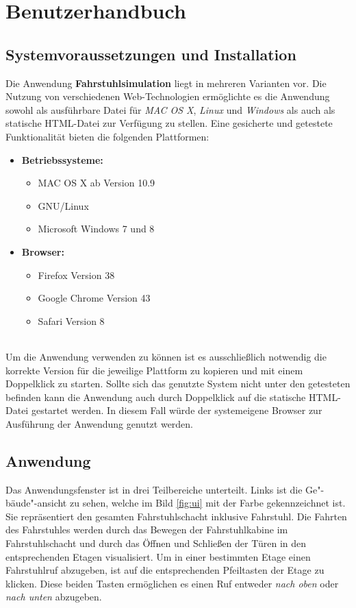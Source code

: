 \part{Benutzerhandbuch}
\chapter{Systemvoraussetzungen und Installation}
Die Anwendung \textbf{Fahrstuhlsimulation} liegt in mehreren Varianten vor. Die Nutzung von verschiedenen Web-Technologien ermöglichte es die Anwendung sowohl als ausführbare Datei für \textit{MAC OS X}, \textit{Linux} und \textit{Windows} als auch als statische HTML-Datei zur Verfügung zu stellen. Eine gesicherte und getestete Funktionalität bieten die folgenden Plattformen:

\begin{itemize}
	\item \textbf{Betriebssysteme:}
	\begin{itemize}
		\item MAC OS X ab Version 10.9
		\item GNU/Linux
		\item Microsoft Windows 7 und 8
	\end{itemize}
	\item \textbf{Browser:}
	\begin{itemize}
		\item Firefox Version 38
		\item Google Chrome Version 43
		\item Safari Version 8
	\end{itemize}
\end{itemize}

\paragraph{}
Um die Anwendung verwenden zu können ist es ausschließlich notwendig die korrekte Version für die jeweilige Plattform zu kopieren und mit einem Doppelklick zu starten. Sollte sich das genutzte System nicht unter den getesteten befinden kann die Anwendung auch durch Doppelklick auf die statische HTML-Datei gestartet werden. In diesem Fall würde der systemeigene Browser zur Ausführung der Anwendung genutzt werden.

\chapter{Anwendung}
Das Anwendungsfenster ist in drei Teilbereiche unterteilt. Links ist die Ge"-bäude"-ansicht zu sehen, welche im Bild \ref{fig:ui} mit der Farbe  gekennzeichnet ist. Sie repräsentiert den gesamten Fahrstuhlschacht inklusive Fahrstuhl. Die Fahrten des Fahrstuhles werden durch das Bewegen der Fahrstuhlkabine im Fahrstuhlschacht und durch das Öffnen und Schließen der Türen in den entsprechenden Etagen visualisiert. Um in einer bestimmten Etage einen Fahrstuhlruf abzugeben, ist auf die entsprechenden Pfeiltasten der Etage zu klicken. Diese beiden Tasten ermöglichen es einen Ruf entweder \textit{nach oben} oder \textit{nach unten} abzugeben.

